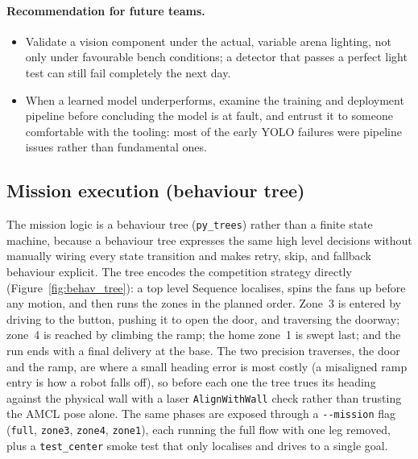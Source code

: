 \documentclass[11pt]{article}
\begin{document}
\paragraph{Recommendation for future teams.}
\begin{itemize}[noitemsep]
    \item Validate a vision component under the actual, variable arena lighting, not only under favourable bench conditions; a detector that passes a perfect light test can still fail completely the next day.
    \item When a learned model underperforms, examine the training and deployment pipeline before concluding the model is at fault, and entrust it to someone comfortable with the tooling: most of the early YOLO failures were pipeline issues rather than fundamental ones.
\end{itemize}

\subsection{Mission execution (behaviour tree)}
The mission logic is a behaviour tree (\texttt{py\_trees}) rather than a finite state machine, because a behaviour tree expresses the same high level decisions without manually wiring every state transition and makes retry, skip, and fallback behaviour explicit. The tree encodes the competition strategy directly (Figure~\ref{fig:behav_tree}): a top level Sequence localises, spins the fans up before any motion, and then runs the zones in the planned order. Zone~3 is entered by driving to the button, pushing it to open the door, and traversing the doorway; zone~4 is reached by climbing the ramp; the home zone~1 is swept last; and the run ends with a final delivery at the base. The two precision traverses, the door and the ramp, are where a small heading error is most costly (a misaligned ramp entry is how a robot falls off), so before each one the tree trues its heading against the physical wall with a laser \texttt{AlignWithWall} check rather than trusting the AMCL pose alone. The same phases are exposed through a \texttt{-{}-mission} flag (\texttt{full}, \texttt{zone3}, \texttt{zone4}, \texttt{zone1}), each running the full flow with one leg removed, plus a \texttt{test\_center} smoke test that only localises and drives to a single goal.
\end{document}
